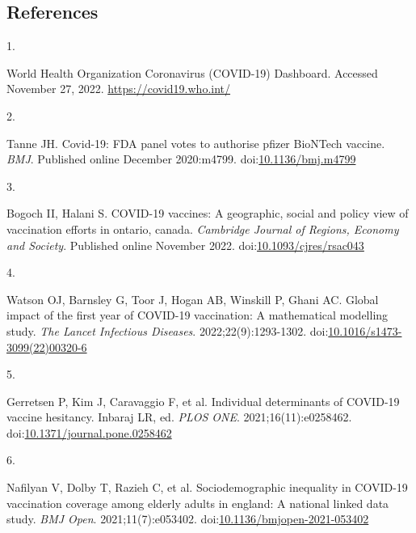 \documentclass[
  letterpaper,
  DIV=11,
  numbers=noendperiod]{scrartcl}
\newlength{\cslhangindent}
\newlength{\csllabelwidth}
\newlength{\cslentryspacingunit} %
\newenvironment{CSLReferences}[2] %
 {%
  \setlength{\parindent}{0pt}
  \ifodd #1
  \let\oldpar\par
  \def\par{\hangindent=\cslhangindent\oldpar}
  \fi
  \setlength{\parskip}{#2\cslentryspacingunit}
 }%
 {}
\newcommand{\CSLLeftMargin}[1]{\parbox[t]{\csllabelwidth}{#1}}
\newcommand{\CSLRightInline}[1]{\parbox[t]{\linewidth - \csllabelwidth}{#1}\break}
\begin{document}
\hypertarget{references}{%
\subsection{References}\label{references}}

\hypertarget{refs}{}
\begin{CSLReferences}{0}{0}
\leavevmode{}%
\CSLLeftMargin{1. }%
\CSLRightInline{{World Health Organization Coronavirus (COVID-19)
Dashboard}. Accessed November 27, 2022. \url{https://covid19.who.int/}}

\leavevmode{}%
\CSLLeftMargin{2. }%
\CSLRightInline{Tanne JH. Covid-19: {FDA} panel votes to authorise
pfizer {BioNTech} vaccine. \emph{{BMJ}}. Published online December
2020:m4799.
doi:\href{https://doi.org/10.1136/bmj.m4799}{10.1136/bmj.m4799}}

\leavevmode{}%
\CSLLeftMargin{3. }%
\CSLRightInline{Bogoch II, Halani S. {COVID}-19 vaccines: A geographic,
social and policy view of vaccination efforts in ontario, canada.
\emph{Cambridge Journal of Regions, Economy and Society}. Published
online November 2022.
doi:\href{https://doi.org/10.1093/cjres/rsac043}{10.1093/cjres/rsac043}}

\leavevmode{}%
\CSLLeftMargin{4. }%
\CSLRightInline{Watson OJ, Barnsley G, Toor J, Hogan AB, Winskill P,
Ghani AC. Global impact of the first year of {COVID}-19 vaccination: A
mathematical modelling study. \emph{The Lancet Infectious Diseases}.
2022;22(9):1293-1302.
doi:\href{https://doi.org/10.1016/s1473-3099(22)00320-6}{10.1016/s1473-3099(22)00320-6}}

\leavevmode{}%
\CSLLeftMargin{5. }%
\CSLRightInline{Gerretsen P, Kim J, Caravaggio F, et al. Individual
determinants of {COVID}-19 vaccine hesitancy. Inbaraj LR, ed.
\emph{{PLOS} {ONE}}. 2021;16(11):e0258462.
doi:\href{https://doi.org/10.1371/journal.pone.0258462}{10.1371/journal.pone.0258462}}

\leavevmode{}%
\CSLLeftMargin{6. }%
\CSLRightInline{Nafilyan V, Dolby T, Razieh C, et al. Sociodemographic
inequality in {COVID}-19 vaccination coverage among elderly adults in
england: A national linked data study. \emph{{BMJ} Open}.
2021;11(7):e053402.
doi:\href{https://doi.org/10.1136/bmjopen-2021-053402}{10.1136/bmjopen-2021-053402}}


\end{CSLReferences}
\end{document}
